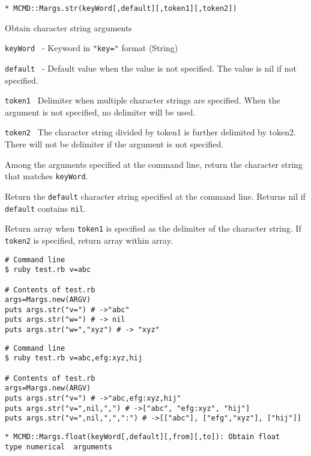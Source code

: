 {\Large
\begin{verbatim}
* MCMD::Margs.str(keyWord[,default][,token1][,token2])
\end{verbatim}
}
Obtain character string arguments 
\begin{description}
	\setlength{\itemindent}{0mm}
	\item {\large \verb/keyWord /} - Keyword in \verb/"key="/ format (String)
	\item {\large \verb/default /} - Default value when the value is not specified. The value is nil if not specified. 
	\item {\large \verb/token1 /} Delimiter when multiple character strings are specified. When the argument is not specified, no delimiter will be used. 
	\item {\large \verb/token2 /} The character string divided by token1 is further delimited by token2. There will not be delimiter if the argument is not specified.\end{description}

Among the arguments specified at the command line, return the character string that matches \verb/keyWord/. 

Return the \verb/default/ character string specified at the command line. Returns nil if \verb/default/ contains \verb/nil/. 

Return array when \verb/token1/ is specified as the delimiter of the character string. If \verb/token2/ is specified, return array within array. 


\begin{Verbatim}[baselinestretch=0.7,frame=single]
# Command line
$ ruby test.rb v=abc

# Contents of test.rb
args=Margs.new(ARGV)
puts args.str("v=") # ->"abc"
puts args.str("w=") # -> nil
puts args.str("w=","xyz") # -> "xyz"
\end{Verbatim}

\begin{Verbatim}[baselinestretch=0.7,frame=single]
# Command line
$ ruby test.rb v=abc,efg:xyz,hij

# Contents of test.rb
args=Margs.new(ARGV)
puts args.str("v=") # ->"abc,efg:xyz,hij"
puts args.str("v=",nil,",") # ->["abc", "efg:xyz", "hij"]
puts args.str("v=",nil,",",":") # ->[["abc"], ["efg","xyz"], ["hij"]]
\end{Verbatim}


{\Large
\begin{verbatim}
* MCMD::Margs.float(keyWord[,default][,from][,to]): Obtain float 
type numerical  arguments 
\end{verbatim}
}

